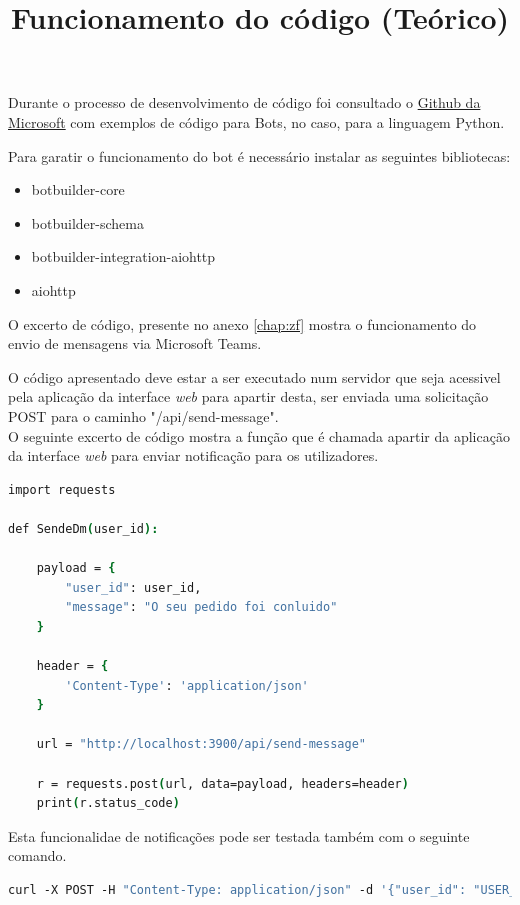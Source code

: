 \title*{\textbf{Funcionamento do código (Teórico)}}

Durante o processo de desenvolvimento de código foi consultado o \href{https://github.com/microsoft/BotBuilder-Samples/tree/main/samples/python/02.echo-bot}{Github da Microsoft}
com exemplos de código para Bots, no caso, para a linguagem Python.

Para garatir o funcionamento do bot é necessário instalar as seguintes bibliotecas:
\begin{itemize}
    \item botbuilder-core
    \item botbuilder-schema
    \item botbuilder-integration-aiohttp
    \item aiohttp
\end{itemize}


O excerto de código, presente no anexo \ref{chap:zf} mostra o funcionamento do 
envio de mensagens via Microsoft Teams.







O código apresentado deve estar a ser executado num servidor que seja acessivel pela
aplicação da interface \textit{web} para apartir desta, ser enviada uma solicitação POST
para o caminho "/api/send-message". \\

O seguinte excerto de código mostra a função que é chamada apartir da aplicação
da interface \textit{web} para enviar notificação para os utilizadores.
\begin{lstlisting}[language=csh, caption={Solicitação para enviar mensagem}]
import requests

def SendeDm(user_id):

    payload = {
        "user_id": user_id,
        "message": "O seu pedido foi conluido"
    }
    
    header = {
        'Content-Type': 'application/json'
    }

    url = "http://localhost:3900/api/send-message"
    
    r = requests.post(url, data=payload, headers=header)
    print(r.status_code)
\end{lstlisting}

Esta funcionalidae de notificações pode ser testada também com o seguinte comando.
\begin{lstlisting}[language=csh, caption={Teste de notificação via Microsoft Teams}]
    curl -X POST -H "Content-Type: application/json" -d '{"user_id": "USER_ID", "message": "conteudo da mensagem direta"}' http://localhost:3978/api/send-message
\end{lstlisting}


